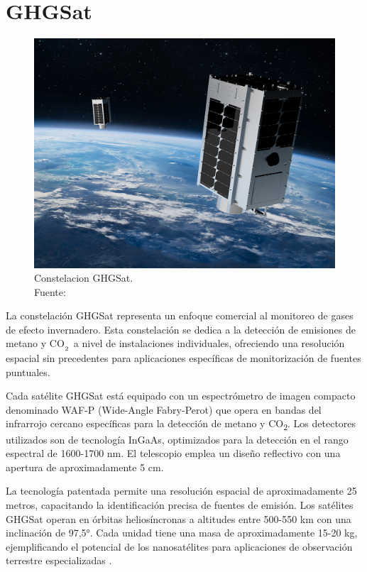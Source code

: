 \section{GHGSat}

\begin{figure}[H]
    \centering
    \includegraphics[width=0.8\linewidth]{2.Misiones_Semejantes/GHGSat_Constellation-of-Six-Satellites_1440x1100-2772752015.png}
    \caption{Constelacion GHGSat. \\Fuente: \cite{gosat_gw}
}
\end{figure}

La constelación GHGSat representa un enfoque comercial al monitoreo de gases de efecto invernadero. Esta constelación se dedica a la detección de emisiones de metano y CO$_\textsubscript{2}$ a nivel de instalaciones individuales, ofreciendo una resolución espacial sin precedentes para aplicaciones específicas de monitorización de fuentes puntuales.


Cada satélite GHGSat está equipado con un espectrómetro de imagen compacto denominado WAF-P (Wide-Angle Fabry-Perot) que opera en bandas del infrarrojo cercano específicas para la detección de metano y CO\textsubscript{2}. Los detectores utilizados son de tecnología InGaAs, optimizados para la detección en el rango espectral de 1600-1700 nm. El telescopio emplea un diseño reflectivo con una apertura de aproximadamente 5 cm.


La tecnología patentada permite una resolución espacial de aproximadamente 25 metros, capacitando la identificación precisa de fuentes de emisión. Los satélites GHGSat operan en órbitas heliosíncronas a altitudes entre 500-550 km con una inclinación de 97,5°. Cada unidad tiene una masa de aproximadamente 15-20 kg, ejemplificando el potencial de los nanosatélites para aplicaciones de observación terrestre especializadas \cite{wmo_ghgsat_spectrometer}.






